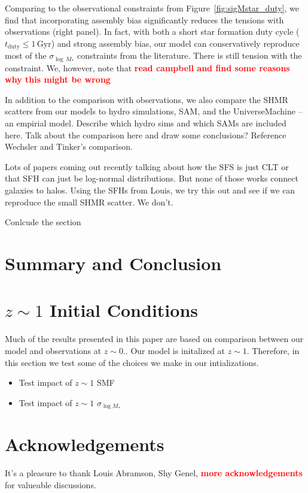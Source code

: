 \documentclass[12pt, letterpaper, preprint, tighten]{aastex}
\newcommand{\todo}[1]{{\bf \textcolor{red}{#1}}}
\newcommand{\bitem}{\begin{itemize}}
\newcommand{\eitem}{\end{itemize}}
\begin{document}
Comparing to the observational constraints from Figure~\ref{fig:sigMstar_duty}, 
we find that incorporating assembly bias significantly reduces the tensions 
with observations (right panel). In fact, with both a short star formation duty cycle
($t_\mathrm{duty} \leq 1\,\mathrm{Gyr}$) and strong assembly bias, our model
can conservatively reproduce most of the $\sigma_{\log\,M_*}$ constraints from
the literature. There is still tension with the \cite{yang2009} constraint. 
We, however, note that \todo{read campbell and find some reasons why this might 
be wrong}

In addition to the comparison with observations, we also compare the SHMR scatters 
from our models to hydro simulations, SAM, and the UniverseMachine -- an empirial 
model. Describe which hydro sims and which SAMs are included here. Talk about the 
comparison here and draw some conclusions? Reference Wechsler and Tinker's comparison. 


Lots of papers coming out recently talking about how the SFS is just CLT or 
that SFH can just be log-normal distributions. But none of those works connect
galaxies to halos. Using the SFHs from Louis, we try this out and see if we 
can reproduce the small SHMR scatter. We don't. 


Conlcude the section 

\section{Summary and Conclusion} \label{sec:summary}


\appendix
\section{$z \sim 1$ Initial Conditions} \label{app:z1}
Much of the results presented in this paper are based on comparison 
between our model and observations at $z \sim 0.$. Our model is initalized 
at $z \sim 1$. Therefore, in this section we test some of the choices 
we make in our intializations. 

\bitem
\item Test impact of $z \sim 1$ SMF
\item Test impact of $z \sim 1$ $\sigma_{\log M_*}$ 
\eitem

\section*{Acknowledgements}
It's a pleasure to thank 
    Louis Abramson, 
    Shy Genel, 
    \todo{more acknowledgements} 
for valueable discussions. 



\end{document}
